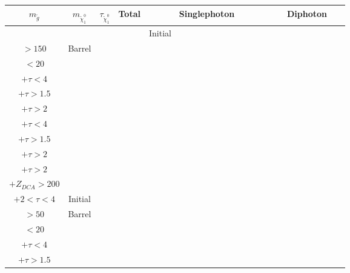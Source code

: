 \documentclass[8pt]{extarticle}
\begin{document}
\begin{longtable}{|c|c|c|c|c|c|c|c|c|c|c|c|c|c|c|c|c|c|c|c|c|c|c|c|c|}
\hline 
$m_{\tilde{g}}$ & $m_{\tilde{\chi}_1^0}$ & $\tau_{\tilde{\chi}_1^0}$ & Total &\multicolumn{12}{|c|}{Singlephoton} & \multicolumn{9}{|c|}{Diphoton} \\ 
\hline 
 & & & & Initial & \begin{tabular}{@{}c@{}} $p_T$ \\ $> 150$\end{tabular} & Barrel & \begin{tabular}{@{}c@{}} $E_T^{miss}$ \\ $< 20$\end{tabular} & \begin{tabular}{@{}c@{}} $E_T^{miss} > 75$ \\ $+ \tau < 4$\end{tabular} & \begin{tabular}{@{}c@{}} $E_T^{miss} > 75$ \\ $+ \tau > 1.5$ \end{tabular} & \begin{tabular}{@{}c@{}} $E_T^{miss} > 75$ \\ $+ \tau > 2$ \end{tabular} & \begin{tabular}{@{}c@{}} $E_T^{miss} > 200$ \\ $+ \tau < 4$\end{tabular} & \begin{tabular}{@{}c@{}} $E_T^{miss} > 200$ \\ $+ \tau > 1.5$ \end{tabular} & \begin{tabular}{@{}c@{}} $E_T^{miss} > 200$ \\ $+ \tau > 2$ \end{tabular} & \begin{tabular}{@{}c@{}} $E_T^{miss} > 200$ \\ $+ \tau > 2$ \\ $+Z_{DCA} > 200$\end{tabular} & \begin{tabular}{@{}c@{}} $E_{T}^{miss} > 200$ \\ $+ 2 < \tau < 4$ \end{tabular} & Initial & \begin{tabular}{@{}c@{}} $p_T$ \\ $> 50$\end{tabular} & Barrel & \begin{tabular}{@{}c@{}} $E_T^{miss}$ \\ $< 20$\end{tabular} & \begin{tabular}{@{}c@{}} $E_T^{miss} > 75$ \\ $+ \tau < 4$\end{tabular} & \begin{tabular}{@{}c@{}} $E_T^{miss} > 75$ \\ $+ \tau > 1.5$\end{tabular} & \begin{tabular}{@{}c@{}} $E_T^{miss} > 75$ 
\end{longtable}
\end{document}
